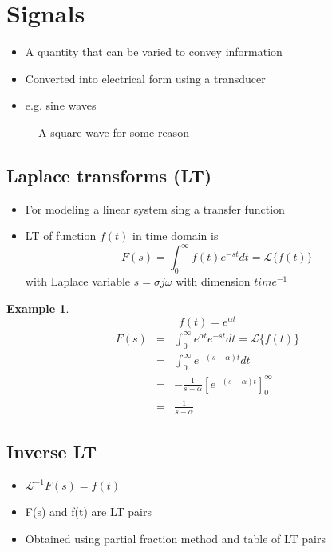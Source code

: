 \documentclass[11pt]{article} %
\theoremstyle{definition}
\newtheorem{example}{Example}[subsection]
\begin{document}
\section{Signals}
	\begin{itemize}
	\item A quantity that can be varied to convey information
	\item Converted into electrical form using a transducer
	\item e.g. sine waves
		
	\end{itemize}

	\begin{figure}[h]
		\centering
		\caption{A square wave for some reason}
	\end{figure}

\subsection{Laplace transforms (LT)}
	\begin{itemize}
	\item For modeling a linear system sing a transfer function
	\item LT of function $f(t)$ in time domain is
		\begin{equation}
			F(s) = \int^\infty _0 f(t)e^{-st}dt =\mathcal{L}\{f(t)\}
		\end{equation}
		with Laplace variable $s = \sigma j\omega$ with dimension $time^{-1}$
	\end{itemize}

\begin{example}
	\begin{equation}
		f(t) =  e^{\alpha t} 
	\end{equation}
	\begin{eqnarray}
		F(s) &=& \int^\infty_0 e^{\alpha t} e^{-st} dt = \mathcal{L}\{f(t)\} \nonumber \\
		&=& \int^\infty_0 e^{-(s-\alpha)t} dt \nonumber \\
		&=& -\frac{1}{s-\alpha}\left[{e^{-(s-\alpha)t}}\right]_0^\infty \nonumber \\
		&=& \frac{1}{s-\alpha}
	\end{eqnarray}
\end{example}
\subsection{Inverse LT}
	\begin{itemize}
		\item $\mathcal{L}^{-1} F(s)=f(t)$
		\item F(s) and  f(t) are LT pairs
		\item Obtained using partial fraction method and table of LT pairs
	\end{itemize}
\end{document}
